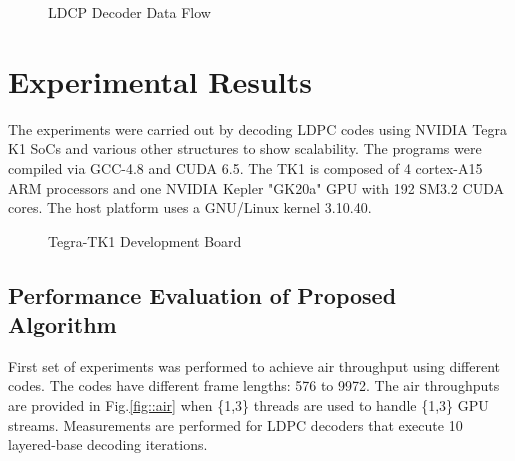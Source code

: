 \documentclass{article}
\begin{document}
\begin{figure}[h]
\begin{centering}
\caption[width=.3\textwidth]{LDCP Decoder Data Flow}
\label{fig_total}
\end{centering}
\end{figure}

\section{Experimental Results} \label{sec4}

The experiments were carried out by decoding LDPC codes using NVIDIA Tegra K1 SoCs and various other structures to show scalability. The programs were compiled via GCC-4.8 and CUDA 6.5. The TK1 is composed of 4 cortex-A15 ARM processors and one NVIDIA Kepler "GK20a" GPU with 192 SM3.2 CUDA cores. The host platform uses a GNU/Linux kernel 3.10.40.

\begin{figure}[h]
\begin{centering}
\caption[width=.3\textwidth]{Tegra-TK1 Development Board}
\label{tegra}
\end{centering}
\end{figure}

\subsection{Performance Evaluation of Proposed Algorithm} 
First set of experiments was performed to achieve air throughput using different codes. The codes have different frame lengths: 576 to 9972. The air throughputs are provided in Fig.\ref{fig::air} when \{1,3\} threads are used to handle \{1,3\} GPU streams. Measurements are performed for LDPC decoders that execute 10 layered-base decoding iterations.
\end{document}
